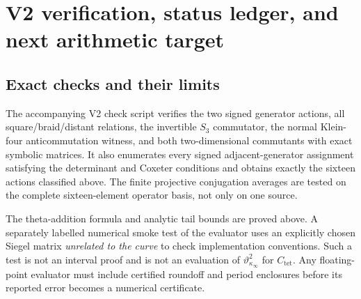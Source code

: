 \documentclass[11pt]{article}
\theoremstyle{definition}
\theoremstyle{remark}
\begin{document}
\section{V2 verification, status ledger, and next arithmetic target}
\label{sec:v2-status}

\subsection{Exact checks and their limits}
The accompanying V2 check script verifies the two signed generator actions,
all square/braid/distant relations, the invertible $S_3$ commutator, the
normal Klein-four anticommutation witness, and both two-dimensional
commutants with exact symbolic matrices. It also enumerates every signed
adjacent-generator assignment satisfying the determinant and Coxeter
conditions and obtains exactly the sixteen actions classified above.
The finite projective conjugation averages are tested on the complete
sixteen-element operator basis, not only on one source.

The theta-addition formula and analytic tail bounds are proved above. A
separately labelled numerical smoke test of the evaluator uses an explicitly
chosen Siegel matrix \emph{unrelated to the curve} to check implementation
conventions. Such a test is not an interval proof and is not an evaluation
of $\vartheta_{\kappa_\infty}^2$ for $C_{\mathrm{tet}}$. Any floating-point
evaluator must include certified roundoff and period enclosures before its
reported error becomes a numerical certificate.
\end{document}
